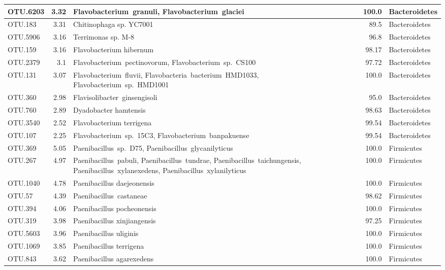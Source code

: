 \begin{longtable}{lrp{6.5cm}rl}
OTU.6203 & 3.32 & \mbox{Flavobacterium granuli}, \mbox{Flavobacterium glaciei} & 100.0 & Bacteroidetes \\ \midrule
OTU.183 & 3.31 & Chitinophaga sp. YC7001 & 89.5 & Bacteroidetes \\ \midrule
OTU.5906 & 3.16 & Terrimonas sp. M-8 & 96.8 & Bacteroidetes \\ \midrule
OTU.159 & 3.16 & Flavobacterium hibernum & 98.17 & Bacteroidetes \\ \midrule
OTU.2379 & 3.1 & \mbox{Flavobacterium pectinovorum}, \mbox{Flavobacterium sp. CS100} & 97.72 & Bacteroidetes \\ \midrule
OTU.131 & 3.07 & \mbox{Flavobacterium fluvii}, \mbox{Flavobacteria bacterium HMD1033}, \mbox{Flavobacterium sp. HMD1001} & 100.0 & Bacteroidetes \\ \midrule
OTU.360 & 2.98 & \mbox{Flavisolibacter ginsengisoli} & 95.0 & Bacteroidetes \\ \midrule
OTU.760 & 2.89 & Dyadobacter hamtensis & 98.63 & Bacteroidetes \\ \midrule
OTU.3540 & 2.52 & Flavobacterium terrigena & 99.54 & Bacteroidetes \\ \midrule
OTU.107 & 2.25 & \mbox{Flavobacterium sp. 15C3}, \mbox{Flavobacterium banpakuense} & 99.54 & Bacteroidetes \\ \midrule
OTU.369 & 5.05 & \mbox{Paenibacillus sp. D75}, \mbox{Paenibacillus glycanilyticus} & 100.0 & Firmicutes \\ \midrule
OTU.267 & 4.97 & \mbox{Paenibacillus pabuli}, \mbox{Paenibacillus tundrae}, \mbox{Paenibacillus taichungensis}, \mbox{Paenibacillus xylanexedens}, \mbox{Paenibacillus xylanilyticus} & 100.0 & Firmicutes \\ \midrule
OTU.1040 & 4.78 & Paenibacillus daejeonensis & 100.0 & Firmicutes \\ \midrule
OTU.57 & 4.39 & \mbox{Paenibacillus castaneae} & 98.62 & Firmicutes \\ \midrule
OTU.394 & 4.06 & Paenibacillus pocheonensis & 100.0 & Firmicutes \\ \midrule
OTU.319 & 3.98 & Paenibacillus xinjiangensis & 97.25 & Firmicutes \\ \midrule
OTU.5603 & 3.96 & Paenibacillus uliginis & 100.0 & Firmicutes \\ \midrule
OTU.1069 & 3.85 & Paenibacillus terrigena & 100.0 & Firmicutes \\ \midrule
OTU.843 & 3.62 & Paenibacillus agarexedens & 100.0 & Firmicutes \\ \midrule

\end{longtable}
